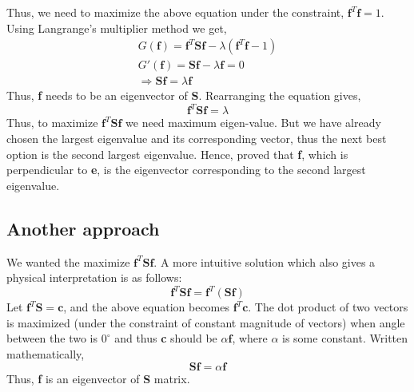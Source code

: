 \documentclass[12pt, a4paper]{article}
\begin{document}
Thus, we need to maximize the above equation under the constraint, $\textbf{f}^T\textbf{f}=1$. Using Langrange's multiplier method we get,
\begin{align*}
    G(\textbf{f}) = \textbf{f}^T\textbf{S}\textbf{f} - \lambda(\textbf{f}^T\textbf{f}-1)\\
     G'(\textbf{f}) = \textbf{S}\textbf{f} - \lambda\textbf{f} = 0\\
    \Longrightarrow \textbf{S}\textbf{f} = \lambda\textbf{f}
\end{align*}
Thus, \textbf{f} needs to be an eigenvector of \textbf{S}. Rearranging the equation gives,
\begin{equation*}
    \textbf{f}^T\textbf{S}\textbf{f} = \lambda
\end{equation*}
Thus, to maximize $\textbf{f}^T\textbf{S}\textbf{f}$ we need maximum eigen-value. But we have already chosen the largest eigenvalue and its corresponding vector, thus the next best option is the second largest eigenvalue. Hence, proved that \textbf{f}, which is perpendicular to \textbf{e}, is the eigenvector corresponding to the second largest eigenvalue.
\subsection{Another approach}
We wanted the maximize $\textbf{f}^T\textbf{S}\textbf{f}$. A more intuitive solution which also gives a physical interpretation is as follows:
\begin{equation*}
    \textbf{f}^T\textbf{S}\textbf{f} = \textbf{f}^T(\textbf{S}\textbf{f})
\end{equation*}
Let $\textbf{f}^T\textbf{S} = \textbf{c}$, and the above equation becomes $\textbf{f}^T\textbf{c}$. The dot product of two vectors is maximized (under the constraint of constant magnitude of vectors) when angle between the two is $0^{\circ}$ and thus \textbf{c} should be $\alpha\textbf{f}$, where $\alpha$ is some constant. Written mathematically,
\begin{equation*}
    \textbf{S}\textbf{f} = \alpha \textbf{f}
\end{equation*}
Thus, \textbf{f} is an eigenvector of \textbf{S} matrix.
\end{document}
